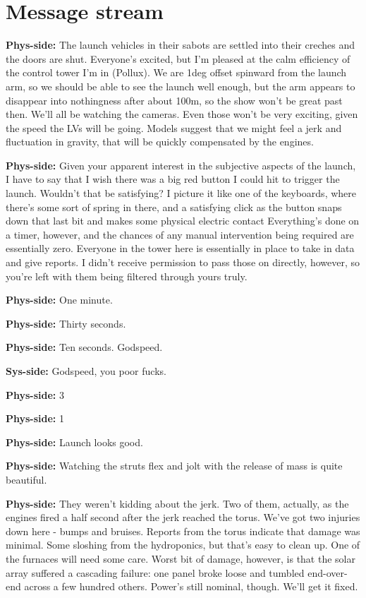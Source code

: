 \hypertarget{message-stream}{%
\section{Message stream}\label{message-stream}}

\textbf{Phys-side:} The launch vehicles in their sabots are settled into their creches and the doors are shut. Everyone's excited, but I'm pleased at the calm efficiency of the control tower I'm in (Pollux). We are 1deg offset spinward from the launch arm, so we should be able to see the launch well enough, but the arm appears to disappear into nothingness after about 100m, so the show won't be great past then. We'll all be watching the cameras. Even those won't be very exciting, given the speed the LVs will be going. Models suggest that we might feel a jerk and fluctuation in gravity, that will be quickly compensated by the engines.

\textbf{Phys-side:} Given your apparent interest in the subjective aspects of the launch, I have to say that I wish there was a big red button I could hit to trigger the launch. Wouldn't that be satisfying? I picture it like one of the keyboards, where there's some sort of spring in there, and a satisfying click as the button snaps down that last bit and makes some physical electric contact Everything's done on a timer, however, and the chances of any manual intervention being required are essentially zero. Everyone in the tower here is essentially in place to take in data and give reports. I didn't receive permission to pass those on directly, however, so you're left with them being filtered through yours truly.

\textbf{Phys-side:} One minute.

\textbf{Phys-side:} Thirty seconds.

\textbf{Phys-side:} Ten seconds. Godspeed.

\textbf{Sys-side:} Godspeed, you poor fucks.

\textbf{Phys-side:} 3

\textbf{Phys-side:} 1

\textbf{Phys-side:} Launch looks good.

\textbf{Phys-side:} Watching the struts flex and jolt with the release of mass is quite beautiful.

\textbf{Phys-side:} They weren't kidding about the jerk. Two of them, actually, as the engines fired a half second after the jerk reached the torus. We've got two injuries down here - bumps and bruises. Reports from the torus indicate that damage was minimal. Some sloshing from the hydroponics, but that's easy to clean up. One of the furnaces will need some care. Worst bit of damage, however, is that the solar array suffered a cascading failure: one panel broke loose and tumbled end-over-end across a few hundred others. Power's still nominal, though. We'll get it fixed.

